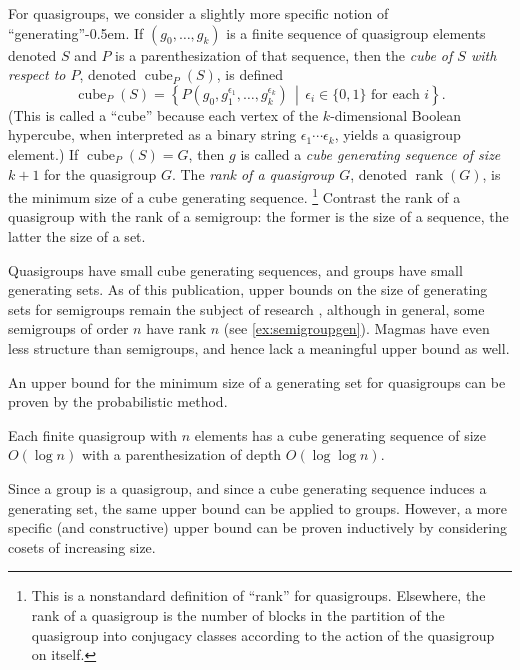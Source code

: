 \documentclass{article}
\newcommand{\todo}[1]{\textbf{TODO #1}}
\DeclareMathOperator{\cube}{cube}
\DeclareMathOperator{\rank}{rank}
\begin{document}
For quasigroups, we consider a slightly more specific notion of ``generating''\kern-0.5em.
If $(g_0, \dotsc, g_k)$ is a finite sequence of quasigroup elements denoted $S$ and $P$ is a parenthesization of that sequence, then the \emph{cube of $S$ with respect to $P$}, denoted $\cube_P(S)$, is defined
\begin{equation*}
  \cube_P(S) = \left\{P(g_0, g_1^{\epsilon_1}, \dotsc, g_k^{\epsilon_k}) \, \middle| \, \epsilon_i \in \{0, 1\} \text{ for each } i \right\}.
\end{equation*}
(This is called a ``cube'' because each vertex of the $k$-dimensional Boolean hypercube, when interpreted as a binary string $\epsilon_1 \dotsb \epsilon_k$, yields a quasigroup element.)
If $\cube_P(S) = G$, then $g$ is called a \emph{cube generating sequence of size $k + 1$} for the quasigroup $G$.
The \emph{rank of a quasigroup $G$}, denoted $\rank(G)$, is the minimum size of a cube generating sequence.%
\footnote{
  This is a nonstandard definition of ``rank'' for quasigroups.
  Elsewhere, the rank of a quasigroup is the number of blocks in the partition of the quasigroup into conjugacy classes according to the action of the quasigroup on itself.
}
Contrast the rank of a quasigroup with the rank of a semigroup: the former is the size of a sequence, the latter the size of a set.


Quasigroups have small cube generating sequences, and groups have small generating sets.
As of this publication, upper bounds on the size of generating sets for semigroups remain the subject of research \autocite{gray14}, although in general, some semigroups of order $n$ have rank $n$ (see \autoref{ex:semigroupgen}).
Magmas have even less structure than semigroups, and hence lack a meaningful upper bound as well.

An upper bound for the minimum size of a generating set for quasigroups can be proven by the probabilistic method.

\begin{lemma}\label{lem:small}
  Each finite quasigroup with $n$ elements has a cube generating sequence of size $O(\log n)$ with a parenthesization of depth $O(\log \log n)$.
\end{lemma}

Since a group is a quasigroup, and since a cube generating sequence induces a generating set, the same upper bound can be applied to groups.
However, a more specific (and constructive) upper bound can be proven inductively by considering cosets of increasing size.
\end{document}
